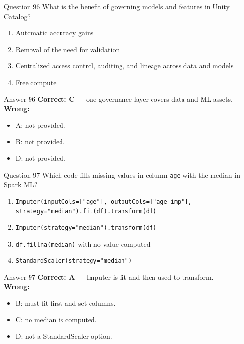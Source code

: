 \documentclass[aspectratio=169,11pt]{beamer}
\begin{document}
\begin{frame}{Question 96}
What is the benefit of governing models and features in Unity Catalog?
\begin{enumerate}[label=\Alph*.]
\item Automatic accuracy gains
\item Removal of the need for validation
\item Centralized access control, auditing, and lineage across data and models
\item Free compute
\end{enumerate}
\end{frame}
\begin{frame}{Answer 96}
\textbf{Correct: C} --- one governance layer covers data and ML assets.\\
\vspace{0.5em}
\textbf{Wrong:}
\begin{itemize}
\item A: not provided.
\item B: not provided.
\item D: not provided.
\end{itemize}
\end{frame}

\begin{frame}{Question 97}
Which code fills missing values in column \texttt{age} with the median in Spark ML?
\begin{enumerate}[label=\Alph*.]
\item \texttt{Imputer(inputCols=["age"], outputCols=["age\_imp"], strategy="median").fit(df).transform(df)}
\item \texttt{Imputer(strategy="median").transform(df)}
\item \texttt{df.fillna(median)} with no value computed
\item \texttt{StandardScaler(strategy="median")}
\end{enumerate}
\end{frame}
\begin{frame}{Answer 97}
\textbf{Correct: A} --- Imputer is fit and then used to transform.\\
\vspace{0.5em}
\textbf{Wrong:}
\begin{itemize}
\item B: must fit first and set columns.
\item C: no median is computed.
\item D: not a StandardScaler option.
\end{itemize}
\end{frame}
\end{document}
